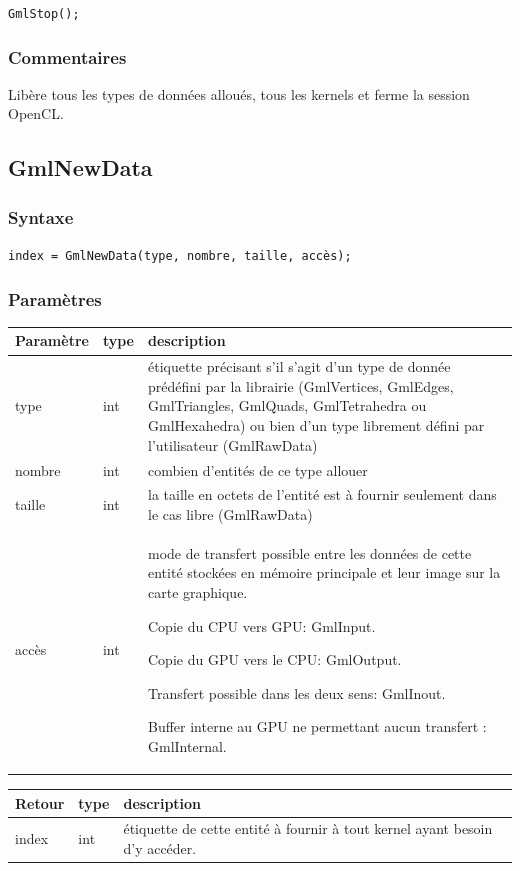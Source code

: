 \documentclass[a4paper,12pt]{article}
\begin{document}
{\tt GmlStop();}
\subsubsection*{Commentaires}

Libère tous les types de données alloués, tous les kernels et ferme la session OpenCL.


\subsection{GmlNewData}
\subsubsection*{Syntaxe}

{\tt index = GmlNewData(type, nombre, taille, accès);}
\subsubsection*{Paramètres}

\begin{tabular}{|m{2cm}|m{1.5cm}|m{10.5cm}|}
\hline
Paramètre  & type   & description \\
\hline
type       & int    & étiquette précisant s'il s'agit d'un type de donnée prédéfini par la librairie (GmlVertices, GmlEdges, GmlTriangles, GmlQuads, GmlTetrahedra ou GmlHexahedra) ou bien d'un type librement défini par l'utilisateur (GmlRawData) \\
\hline
nombre     & int    & combien d'entités de ce type allouer \\
\hline
taille     & int    & la taille en octets de l'entité est à fournir seulement dans le cas libre (GmlRawData) \\
\hline
accès      & int    & mode de transfert possible entre les données de cette entité stockées en mémoire principale et leur image sur la carte graphique.

Copie du CPU vers GPU: GmlInput.

Copie du GPU vers le CPU: GmlOutput.

Transfert possible dans les deux sens: GmlInout.

Buffer interne au GPU ne permettant aucun transfert : GmlInternal.\\
\hline
\end{tabular}

\medskip

\begin{tabular}{|m{2cm}|m{1.5cm}|m{10.5cm}|}
\hline
Retour     & type   & description \\
\hline
index & int & étiquette de cette entité à fournir à tout kernel ayant besoin d'y accéder.\\
\hline
\end{tabular}
\end{document}
